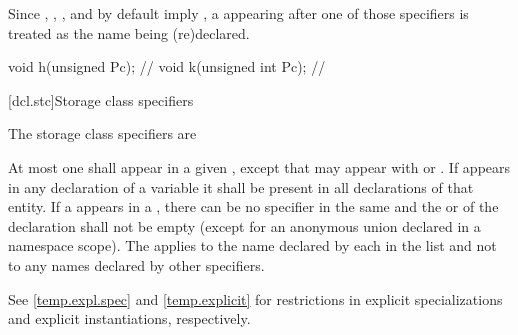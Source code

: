 \pnum
{}%
%
%
%
\begin{note}
Since , , , and 
by default imply , a  appearing after one
of those specifiers is treated as the name being (re)declared.
\begin{example}
\begin{codeblock}
void h(unsigned Pc);            // 
void k(unsigned int Pc);        // 
\end{codeblock}
\end{example}
\end{note}

[dcl.stc]{Storage class specifiers}%
%
%
%
%
%

\pnum
The storage class specifiers are
\begin{bnf}
\br
    \br
    \br
    \br
\end{bnf}

At most one  shall appear in a given
, except that  may appear with  or
. If  appears in any declaration of
a variable it shall be present in all declarations of that entity. If a
appears in a , there can be no
 specifier in the same  and
the  or 
of the declaration shall not be
empty (except for an anonymous union declared in a namespace scope). The
 applies to the name declared by each
 in the list and not to any names declared by
other specifiers.
\begin{note}
See \ref{temp.expl.spec} and \ref{temp.explicit} for restrictions
in explicit specializations and explicit instantiations, respectively.
\end{note}

